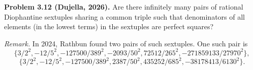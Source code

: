 \textbf{Problem 3.12 (Dujella, 2026).} Are there infinitely many pairs of rational Diophantine sextuples sharing a common triple such that denominators of all elements (in the lowest terms) in the sextuples are perfect squares?

\medskip

\textit{Remark.} In 2024, Rathbun found two pairs of such sextuples. One such pair is
\[
\{3/2^2, -12/5^2, -127500/389^2, -2093/50^2, 72512/265^2, -271859133/27970^2\},
\]
\[
\{3/2^2, -12/5^2, -127500/389^2, 2387/50^2, 435252/685^2, -38178413/6130^2\}.
\]
